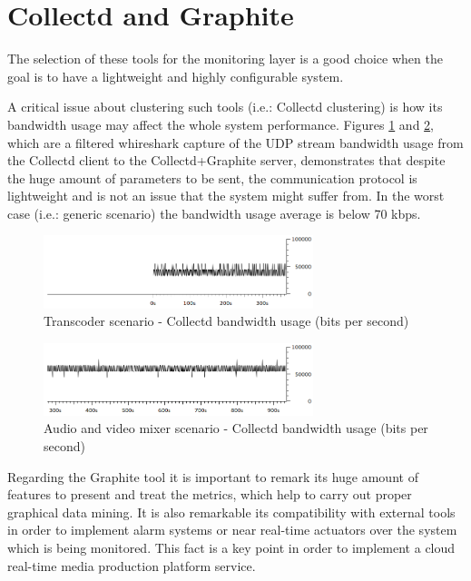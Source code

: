 \section{Collectd and Graphite}

The selection of these tools for the monitoring layer is a good choice when the goal is to have a lightweight and highly configurable system. 

A critical issue about clustering such tools (i.e.: Collectd clustering) is how its bandwidth usage may affect the whole system performance. Figures \ref{F:tscbu} and \ref{F:avmscbu}, which are a filtered whireshark capture of the UDP stream bandwidth usage from the Collectd client to the Collectd+Graphite server, demonstrates that despite the huge amount of parameters to be sent, the communication protocol is lightweight and is not an issue that the system might suffer from. In the worst case (i.e.: generic scenario) the bandwidth usage average is below 70 kbps.

\begin{figure}[!htb]
\begin{center}
\includegraphics[width=0.70\textwidth]{./images/testStats/testStatsDocker/collectdBWbits.png}
\caption{Transcoder scenario - Collectd bandwidth usage (bits per second)}
\label{F:tscbu}
\end{center}
\end{figure}

\begin{figure}[!htb]
\begin{center}
\includegraphics[width=0.70\textwidth]{./images/testAVMix/collectdBWbits.png}
\caption{Audio and video mixer scenario - Collectd bandwidth usage (bits per second)}
\label{F:avmscbu}
\end{center}
\end{figure}

\vbox{Regarding the Graphite tool it is important to remark its huge amount of features to present and treat the metrics, which help to carry out proper graphical data mining. It is also remarkable its compatibility with external tools in order to implement alarm systems or near real-time actuators over the system which is being monitored. This fact is a key point in order to implement a cloud real-time media production platform service.}

